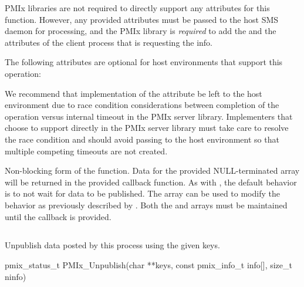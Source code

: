 \reqattrstart
\ac{PMIx} libraries are not required to directly support any attributes for this function. However, any provided attributes must be passed to the host \ac{SMS} daemon for processing, and the \ac{PMIx} library is \textit{required} to add the  and the  attributes of the client process that is requesting the info.

\reqattrend

\optattrstart
The following attributes are optional for host environments that support this operation:


\optattrend

\adviceimplstart
We recommend that implementation of the  attribute be left to the host environment due to race condition considerations between completion of the operation versus internal timeout in the \ac{PMIx} server library. Implementers that choose to support  directly in the \ac{PMIx} server library must take care to resolve the race condition and should avoid passing  to the host environment so that multiple competing timeouts are not created.
\adviceimplend


\descr

Non-blocking form of the  function.
Data for the provided NULL-terminated  array will be returned in the provided callback function.
As with , the default behavior is to not wait for data to be published.
The  array can be used to modify the behavior as previously described by . Both the  and  arrays must be maintained until the callback is provided.



\subsection{}

\summary

Unpublish data posted by this process using the given keys.

\format

\cspecificstart
\begin{codepar}
pmix_status_t
PMIx_Unpublish(char **keys,
               const pmix_info_t info[], size_t ninfo)
\end{codepar}
\cspecificend

